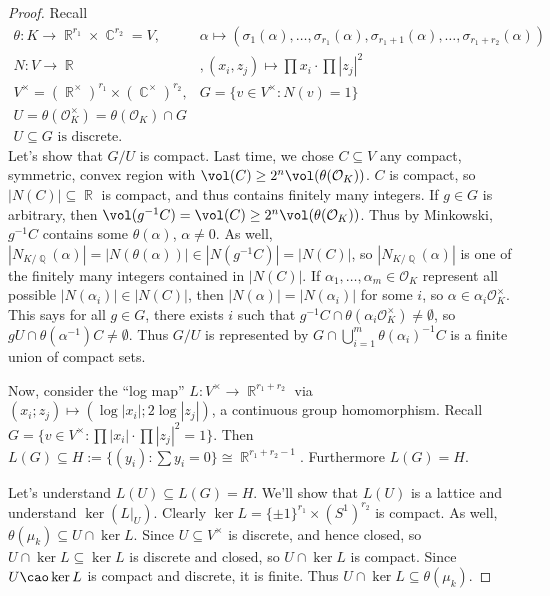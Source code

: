 \documentclass[11pt, a4paper]{memoir}
\DeclareMathOperator{\Q}{{\mathbb{Q}}}
\DeclareMathOperator{\R}{{\mathbb{R}}}
\DeclareMathOperator{\C}{{\mathbb{C}}}
\theoremstyle{change}
\theoremstyle{plain}
\theoremstyle{nonumberplain}
\newtheorem{proof}{Proof}
\begin{document}
\begin{proof}
    Recall
    \begin{align*}
        \theta:K\to\R^{r_1}\times\C^{r_2}=V,&\alpha\mapsto(\sigma_1(\alpha),\ldots,\sigma_{r_1}(\alpha),\sigma_{r_1+1}(\alpha),\ldots,\sigma_{r_1+r_2}(\alpha))\\
        N:V\to\R &, (x_i,z_j)\mapsto \prod x_i\cdot \prod|z_j|^2\\
        V^\times = (\R^\times)^{r_1}\times(\C^\times)^{r_2},&G=\{v\in V^\times:N(v)=1\}\\
        U = \theta(\mathcal{O}_K^\times)=\theta(\mathcal{O}_K)\cap G\\
        U\subseteq G\text{ is discrete.}
    \end{align*}
    Let's show that $G/U$ is compact.
    Last time, we chose $C\subseteq V$ any compact, symmetric, convex region with $\vol(C)\geq 2^n\vol(\theta(\mathcal{O}_K))$.
    $C$ is compact, so $|N(C)|\subseteq\R$ is compact, and thus contains finitely many integers.
    If $g\in G$ is arbitrary, then $\vol(g^{-1}C)=\vol(C)\geq 2^n\vol(\theta(\mathcal{O}_K))$.
    Thus by Minkowski, $g^{-1}C$ contains some $\theta(\alpha)$, $\alpha\neq 0$.
    As well, $|N_{K/\Q}(\alpha)|=|N(\theta(\alpha))|\in|N(g^{-1}C)|=|N(C)|$, so $|N_{K/\Q}(\alpha)|$ is one of the finitely many integers contained in $|N(C)|$.
    If $\alpha_1,\ldots,\alpha_m\in\mathcal{O}_K$ represent all possible $|N(\alpha_i)|\in|N(C)|$, then $|N(\alpha)|=|N(\alpha_i)|$ for some $i$, so $\alpha\in\alpha_i\mathcal{O}_K^\times$.
    This says for all $g\in G$, there exists $i$ such that $g^{-1}C\cap\theta(\alpha_i\mathcal{O}_K^\times)\neq\emptyset$, so $gU\cap\theta(\alpha^{-1})C\neq\emptyset$.
    Thus $G/U$ is represented by $G\cap\bigcup_{i=1}^m\theta(\alpha_i)^{-1}C$ is a finite union of compact sets.

    Now, consider the ``log map'' $L:V^\times\to\R^{r_1+r_2}$ via $(x_i;z_j)\mapsto(\log|x_i|;2\log|z_j|)$, a continuous group homomorphism.
    Recall $G=\{v\in V^\times:\prod|x_i|\cdot\prod|z_j|^2=1\}$.
    Then $L(G)\subseteq H:=\{(y_i):\sum y_i=0\}\cong\R^{r_1+r_2-1}$.
    Furthermore $L(G)=H$.

    Let's understand $L(U)\subseteq L(G)=H$.
    We'll show that $L(U)$ is a lattice and understand $\ker(L|_U)$.
    Clearly $\ker L=\{\pm 1\}^{r_1}\times (S^1)^{r_2}$ is compact.
    As well, $\theta(\mu_k)\subseteq U\cap\ker L$.
    Since $U\subseteq V^\times$ is discrete, and hence closed, so $U\cap\ker L\subseteq\ker L$ is discrete and closed, so $U\cap\ker L$ is compact.
    Since $U\cao\ker L$ is compact and discrete, it is finite.
    Thus $U\cap \ker L\subseteq\theta(\mu_k)$.


\end{proof}
\end{document}
